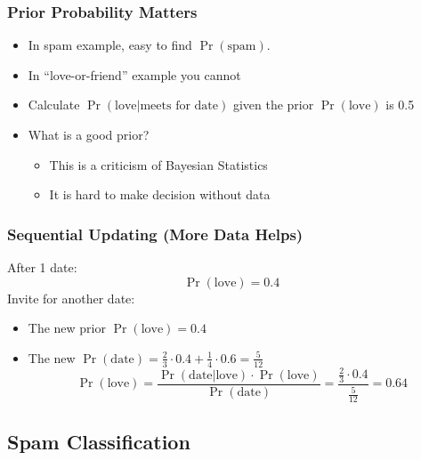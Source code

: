 \documentclass[mathserif, xcolor=table, svgnames]{beamer}
\begin{document}
\begin{frame}
  \frametitle{Prior Probability Matters}
  \begin{itemize}
  \item In spam example, easy to find $\Pr(\text{spam})$.
  \item In ``love-or-friend'' example you cannot
  \item Calculate $\Pr(\text{love}|\text{meets for date})$ given the
    prior $\Pr(\text{love})$ is 0.5
  \item What is a good prior?
    \begin{itemize}
    \item This is a criticism of Bayesian Statistics
    \item It is hard to make decision without data
    \end{itemize}
  \end{itemize}
\end{frame}

\begin{frame}
  \frametitle{Sequential Updating (More Data Helps)}
  After 1 date:
  \begin{equation*}
    \Pr(\text{love}) = 0.4
  \end{equation*}
  Invite for another date:
  \begin{itemize}
  \item The new prior $\Pr(\text{love}) = 0.4$
  \item The new $\Pr(\text{date}) = \frac{2}{3} \cdot 0.4 + \frac{1}{4
    }\cdot 0.6 = \frac{5}{12}$
    \begin{equation*}
      \Pr(\text{love}) = 
      \frac{\Pr(\text{date}|\text{love}) \cdot \Pr(\text{love})}
      {\Pr(\text{date})} 
      = 
      \frac{ \frac{2}{3} \cdot 0.4}
      {\frac{5}{12}} 
      = 0.64
    \end{equation*}
  \end{itemize}
\end{frame}

\subsection{Spam Classification}
\frame{\tableofcontents[currentsubsection]}
\end{document}
